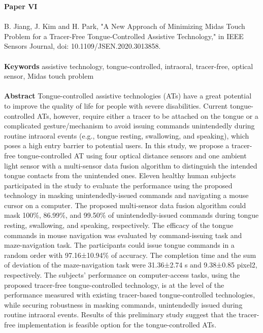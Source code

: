 \noindent
\textbf{Paper VI} 
\\ \\
\noindent
B. Jiang, J. Kim and H. Park, "A New Approach of Minimizing Midas Touch Problem for a Tracer-Free Tongue-Controlled Assistive Technology," in IEEE Sensors Journal, doi: 10.1109/JSEN.2020.3013858.\\ \\

\noindent
\textbf{Keywords} assistive technology, tongue-controlled, intraoral, tracer-free, optical sensor, Midas touch problem
\\ \\

\noindent
\textbf{Abstract} Tongue-controlled assistive technologies (ATs) have a great potential to improve the quality of life for people with severe disabilities. Current tongue-controlled ATs, however, require either a tracer to be attached on the tongue or a complicated gesture/mechanism to avoid issuing commands unintendedly during routine intraoral events (e.g., tongue resting, swallowing, and speaking), which poses a high entry barrier to potential users. In this study, we propose a tracer-free tongue-controlled AT using four optical distance sensors and one ambient light sensor with a multi-sensor data fusion algorithm to distinguish the intended tongue contacts from the unintended ones. Eleven healthy human subjects participated in the study to evaluate the performance using the proposed technology in masking unintendedly-issued commands and navigating a mouse cursor on a computer. The proposed multi-sensor data fusion algorithm could mask 100\%, 86.99\%, and 99.50\% of unintendedly-issued commands during tongue resting, swallowing, and speaking, respectively. The efficacy of the tongue commands in mouse navigation was evaluated by command-issuing task and maze-navigation task. The participants could issue tongue commands in a random order with 97.16±10.94\% of accuracy. The completion time and the sum of deviation of the maze-navigation task were 31.36±2.74 s and 9.38±0.85 pixel2, respectively. The subjects’ performance on computer-access tasks, using the proposed tracer-free tongue-controlled technology, is at the level of the performance measured with existing tracer-based tongue-controlled technologies, while securing robustness in masking commands, unintendedly issued during routine intraoral events. Results of this preliminary study suggest that the tracer-free implementation is feasible option for the tongue-controlled ATs.
\\ \\



